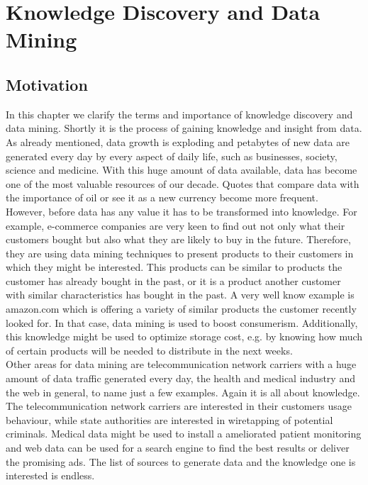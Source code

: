 \chapter{Knowledge Discovery and Data Mining}\label{chapter:kdd}

\section{Motivation}
In this chapter we clarify the terms and importance of knowledge discovery and data mining. Shortly it is the process of gaining knowledge and insight from data. As already mentioned, data growth is exploding and petabytes of new data are generated every day by every aspect of daily life, such as businesses, society, science and medicine. With this huge amount of data available, data has become one of the most valuable resources of our decade. Quotes that compare data with the importance of oil or see it as a new currency become more frequent.
\\
However, before data has any value it has to be transformed into knowledge. For example, e-commerce companies are very keen to find out not only what their customers bought but also what they are likely to buy in the future. Therefore, they are using data mining techniques to present products to their customers in which they might be interested. This products can be similar to products the customer has already bought in the past, or it is a product another customer with similar characteristics has bought in the past. A very well know example is amazon.com which is offering a variety of similar products the customer recently looked for. In that case, data mining is used to boost consumerism. Additionally, this knowledge might be used to optimize storage cost, e.g. by knowing how much of certain products will be needed to distribute in the next weeks.
\\
Other areas for data mining are telecommunication network carriers with a huge amount of data traffic generated every day, the health and medical industry and the web in general, to name just a few examples. Again it is all about knowledge. The telecommunication network carriers are interested in their customers usage behaviour, while state authorities are interested in wiretapping of potential criminals. Medical data might be used to install a ameliorated patient monitoring and web data can be used for a search engine to find the best results or deliver the promising ads. The list of sources to generate data and the knowledge one is interested is endless.


